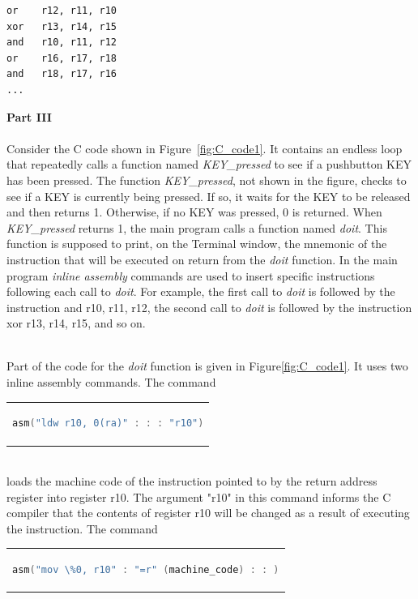 \documentclass[epsfig,10pt,fullpage]{article}
\begin{document}
\begin{minipage}[t]{12.5 cm}
\begin{lstlisting}
or    r12, r11, r10
xor   r13, r14, r15
and   r10, r11, r12
or    r16, r17, r18
and   r18, r17, r16
...
\end{lstlisting}
\end{minipage}

\newpage
\noindent
{\bf Part III}
~\\
~\\
\noindent
Consider the C code shown in Figure~\ref{fig:C_code1}. It contains an endless loop that
repeatedly calls a function named {\it KEY\_pressed} to see if a pushbutton KEY has been pressed.
The function {\it KEY\_pressed}, not shown in the figure, checks to see if a KEY is
currently being pressed. If so, it waits for the KEY to be released and then returns 1. 
Otherwise, if no KEY was pressed, 0 is returned. When {\it KEY\_pressed} returns 1, the main
program calls a function named {\it doit}. This function is supposed to print, on the Terminal 
window, the mnemonic of the instruction that will be executed on return from the {\it doit}
function. In the main program {\it inline assembly} commands are used to insert specific
instructions following each call to {\it doit}. For example, the first call to {\it doit}
is followed by the instruction {\sf and r10, r11, r12}, the second call to {\it doit} is
followed by the instruction {\sf xor r13, r14, r15}, and so on.

~\\
\noindent
Part of the code for the {\it doit} function is given in Figure\ref{fig:C_code1}. It uses two
inline assembly commands. The command


\begin{center}
\begin{tabular}{c}
\begin{lstlisting}[language=C]
asm("ldw r10, 0(ra)" : : : "r10")
\end{lstlisting}
\end{tabular}
\end{center}

~\\
\noindent
loads the machine code of the instruction pointed to by the return address register into register r10. The 
argument "r10" in this command informs the C compiler that the contents of register r10 will be 
changed as a result of executing the instruction. The command

\begin{center}
\begin{tabular}{c}
\begin{lstlisting}[language=C]
asm("mov \%0, r10" : "=r" (machine_code) : : )
\end{lstlisting}
\end{tabular}
\end{center}
\end{document}
